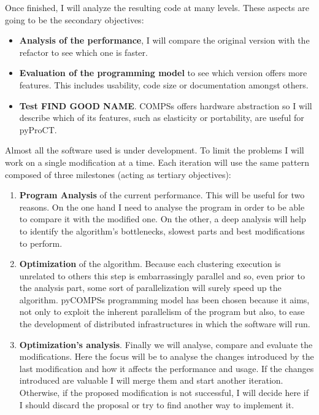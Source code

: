 Once finished, I will analyze the resulting code at many levels. These aspects are going to be the secondary objectives:

\begin{itemize}
\item \textbf{Analysis of the performance}, I will compare the original version with the refactor to see which one is faster.
\item \textbf{Evaluation of the programming model} to see which version offers more features. This includes usability, code size or documentation amongst others.
\item \textbf{Test FIND GOOD NAME}. COMPSs offers hardware abstraction so I will describe which of its features, such as elasticity or portability, are useful for pyProCT.  
\end{itemize}


Almost all the software used is under development. To limit the problems I will work on a single modification at a time. Each iteration will use the same pattern composed of three milestones (acting as tertiary objectives):  
\begin{enumerate}
\item \textbf{Program Analysis} of the current performance. This will be useful for two reasons. On the one hand I need to analyse the program in order to be able to compare it with the modified one. On the other, a deep analysis will help to identify the algorithm's bottlenecks, slowest parts and best modifications to perform.
\item \textbf{Optimization} of the algorithm. Because each clustering execution is unrelated to others this step is embarrassingly parallel and so, even prior to the analysis part, some sort of parallelization will surely speed up the algorithm. pyCOMPSs programming model has been chosen because it aims, not only to exploit the inherent parallelism of the program but also, to ease the development of distributed infrastructures in which the software will run. 
\item \textbf{Optimization's analysis}. Finally we will analyse, compare and evaluate the modifications. Here the focus will be to analyse the changes introduced by the last modification and how it affects the performance and usage. If the changes introduced are valuable I will merge them and start another iteration. Otherwise, if the proposed modification is not successful, I will decide here if I should discard the proposal or try to find another way to implement it.
\end{enumerate}

